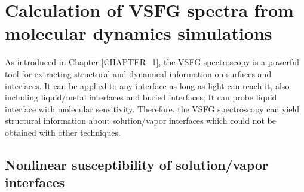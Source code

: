 \section{Calculation of VSFG spectra from molecular dynamics simulations}\label{section_VSFG}
As introduced in Chapter \ref{CHAPTER_1}, the VSFG spectroscopy is a powerful tool for extracting structural and dynamical information
on surfaces and interfaces.
It can be applied to any interface as long as light can reach it, also including liquid/metal interfaces\cite{Harris90,Harris90b,DaiHL95,Halevi96,Wieckowski99} 
and buried interfaces\cite{ChenZ1999,ChenZ2007};
It can probe liquid interface with molecular sensitivity\cite{Khatib2016,Khatib2016b,Khatib2017}.
Therefore, the VSFG spectroscopy can yield structural information about solution/vapor interfaces which could not be obtained with other techniques.

\subsection{Nonlinear susceptibility of solution/vapor interfaces}
